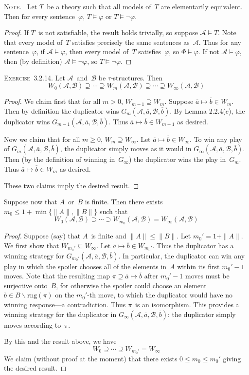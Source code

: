\documentclass[letterpaper]{article}
\newcommand{\A}{\mathcal{A}}
\newcommand{\B}{\mathcal{B}}
\newcommand{\rng}{\mathrm{rng}}
\newcommand{\obar}[1]{\overline{#1}}
\newcommand{\diff}{\mathrel{\backslash}}
\newcommand{\card}[1]{\|{#1}\|}
\newcommand{\exercise}[1]{\noindent\textsc{Exercise~{#1}.}}
\newcommand{\note}{\noindent\textsc{Note.}\ }
\theoremstyle{plain}
\begin{document}
\note
Let $T$~be a theory such that all models of~$T$ are elementarily equivalent. Then for every sentence~$\varphi$, $T\models\varphi$ or $T\models\lnot\varphi$.
\begin{proof}
If $T$~is not satisfiable, the result holds trivially, so suppose $\A\models T$. Note that every model of~$T$ satisfies precisely the same sentences as~$\A$. Thus for any sentence~$\varphi$, if $\A\models\varphi$, then every model of~$T$ satisfies~$\varphi$, so $\Phi\models\varphi$. If not $\A\models\varphi$, then (by definition) $\A\models\lnot\varphi$, so $T\models\lnot\varphi$.
\end{proof}

\exercise{3.2.14}
Let $\A$~and~$\B$ be $\tau$-structures. Then
$$W_0(\A,\B)\supseteq\cdots\supseteq W_m(\A,\B)\supseteq\cdots\supseteq W_{\infty}(\A,\B)$$
\begin{proof}
We claim first that for all $m>0$, $W_{m-1}\supseteq W_m$. Suppose $\obar{a}\mapsto\obar{b}\in W_m$. Then by definition the duplicator wins $G_m(\A,\obar{a},\B,\obar{b})$. By Lemma 2.2.4(c), the duplicator wins $G_{m-1}(\A,\obar{a},\B,\obar{b})$. Thus $\obar{a}\mapsto\obar{b}\in W_{m-1}$ as desired.

Now we claim that for all $m\ge0$, $W_m\supseteq W_{\infty}$. Let $\obar{a}\mapsto\obar{b}\in W_{\infty}$. To win any play of $G_m(\A,\obar{a},\B,\obar{b})$, the duplicator simply moves as it would in $G_{\infty}(\A,\obar{a},\B,\obar{b})$. Then (by the definition of winning in~$G_{\infty}$) the duplicator wins the play in~$G_m$. Thus $\obar{a}\mapsto\obar{b}\in W_m$ as desired.

These two claims imply the desired result.
\end{proof}

Suppose now that $A$~or~$B$ is finite. Then there exists $m_0\le 1+\min\{\card{A},\card{B}\}$ such that
$$W_0(\A,\B)\supset\cdots\supset W_{m_0}(\A,\B)=W_{\infty}(\A,\B)$$
\begin{proof}
Suppose (say) that $A$~is finite and $\card{A}\le\card{B}$. Let $m_0'=1+\card{A}$. We first show that $W_{m_0'}\subseteq W_{\infty}$. Let $\obar{a}\mapsto\obar{b}\in W_{m_0'}$. Thus the duplicator has a winning strategy for $G_{m_0'}(\A,\obar{a},\B,\obar{b})$. In particular, the duplicator can win any play in which the spoiler chooses all of the elements in~$A$ within its first $m_0'-1$ moves. Note that the resulting map $\pi\supseteq\obar{a}\mapsto\obar{b}$ after $m_0'-1$ moves must be surjective onto~$B$, for otherwise the spoiler could choose an element $b\in B\diff\rng(\pi)$ on the $m_0'$-th move, to which the duplicator would have no winning response---a contradiction. Thus $\pi$~is an isomorphism. This provides a winning strategy for the duplicator in $G_{\infty}(\A,\obar{a},\B,\obar{b})$: the duplicator simply moves according to~$\pi$.

By this and the result above, we have
$$W_0\supseteq\cdots\supseteq W_{m_0'}=W_{\infty}$$
We claim (without proof at the moment) that there exists $0\le m_0\le m_0'$ giving the desired result.
\end{proof}
\end{document}
